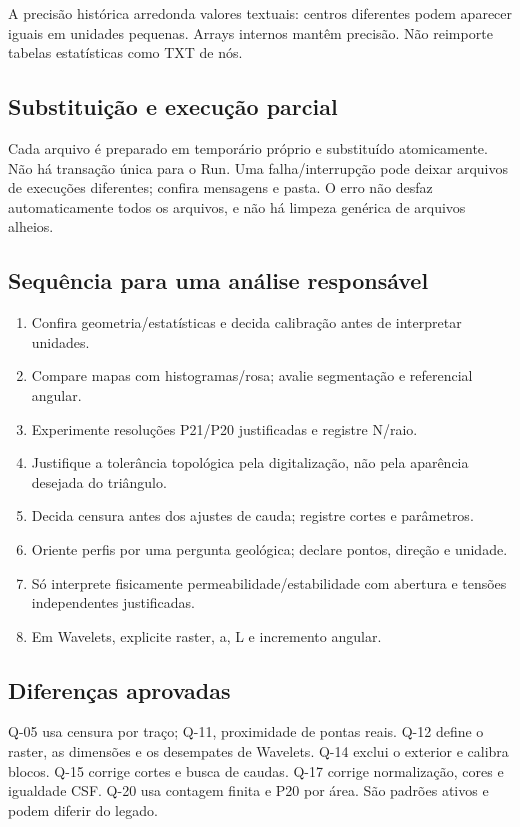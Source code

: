 A precisão histórica arredonda valores textuais: centros diferentes podem aparecer iguais em unidades pequenas. Arrays internos mantêm precisão. Não reimporte tabelas estatísticas como TXT de nós.

\subsection{Substituição e execução parcial}
Cada arquivo é preparado em temporário próprio e substituído atomicamente. Não há transação única para o Run. Uma falha/interrupção pode deixar arquivos de execuções diferentes; confira mensagens e pasta. O erro não desfaz automaticamente todos os arquivos, e não há limpeza genérica de arquivos alheios.

\label{sec:limites}
\subsection{Sequência para uma análise responsável}
\begin{enumerate}
\item Confira geometria/estatísticas e decida calibração antes de interpretar unidades.
\item Compare mapas com histogramas/rosa; avalie segmentação e referencial angular.
\item Experimente resoluções P21/P20 justificadas e registre N/raio.
\item Justifique a tolerância topológica pela digitalização, não pela aparência desejada do triângulo.
\item Decida censura antes dos ajustes de cauda; registre cortes e parâmetros.
\item Oriente perfis por uma pergunta geológica; declare pontos, direção e unidade.
\item Só interprete fisicamente permeabilidade/estabilidade com abertura e tensões independentes justificadas.
\item Em Wavelets, explicite raster, a, L e incremento angular.
\end{enumerate}

\subsection{Diferenças aprovadas}
Q-05 usa censura por traço; Q-11, proximidade de pontas reais. Q-12 define o raster, as dimensões e os desempates de Wavelets. Q-14 exclui o exterior e calibra blocos. Q-15 corrige cortes e busca de caudas. Q-17 corrige normalização, cores e igualdade CSF. Q-20 usa contagem finita e P20 por área. São padrões ativos e podem diferir do legado.

